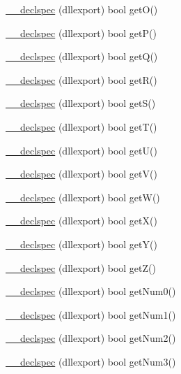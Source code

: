 \begin{DoxyCompactItemize}
\item 
\hyperlink{class_update_data_ac915b9b7ea39948edc30e2be1519f709}{\-\_\-\-\_\-declspec} (dllexport) bool get\-O()
\item 
\hyperlink{class_update_data_af1c7501ba9ff767d1743ab24470b8a7a}{\-\_\-\-\_\-declspec} (dllexport) bool get\-P()
\item 
\hyperlink{class_update_data_aa6581eacfd504ec80c864a4a029d643f}{\-\_\-\-\_\-declspec} (dllexport) bool get\-Q()
\item 
\hyperlink{class_update_data_ace2b66ac3c6fc81d22ea50769842b958}{\-\_\-\-\_\-declspec} (dllexport) bool get\-R()
\item 
\hyperlink{class_update_data_ae9b70a78d59571b58314dd3b4b0be18b}{\-\_\-\-\_\-declspec} (dllexport) bool get\-S()
\item 
\hyperlink{class_update_data_a16254fa55413ea7c37347f54528202c3}{\-\_\-\-\_\-declspec} (dllexport) bool get\-T()
\item 
\hyperlink{class_update_data_ab7969e7d0b5a670bf7a660e07ee3f6d7}{\-\_\-\-\_\-declspec} (dllexport) bool get\-U()
\item 
\hyperlink{class_update_data_a035d09a806173c7166f014ba08baa6a4}{\-\_\-\-\_\-declspec} (dllexport) bool get\-V()
\item 
\hyperlink{class_update_data_a25ced4aeb5fe1bded25ab1556908c5da}{\-\_\-\-\_\-declspec} (dllexport) bool get\-W()
\item 
\hyperlink{class_update_data_adc33999fa417df6ba49edf5067d23fca}{\-\_\-\-\_\-declspec} (dllexport) bool get\-X()
\item 
\hyperlink{class_update_data_a645af2ff970552ad8c1dbb321ff4bda9}{\-\_\-\-\_\-declspec} (dllexport) bool get\-Y()
\item 
\hyperlink{class_update_data_ae426ca7239d958f7ee3ed8761e15de86}{\-\_\-\-\_\-declspec} (dllexport) bool get\-Z()
\item 
\hyperlink{class_update_data_a06bbc26fc1416c4f77051b572badfc5a}{\-\_\-\-\_\-declspec} (dllexport) bool get\-Num0()
\item 
\hyperlink{class_update_data_ac4daf1923558523491759b5cfd201fb1}{\-\_\-\-\_\-declspec} (dllexport) bool get\-Num1()
\item 
\hyperlink{class_update_data_aa350753574338c07f1ed5de6d476d5a3}{\-\_\-\-\_\-declspec} (dllexport) bool get\-Num2()
\item 
\hyperlink{class_update_data_a217fe018b3c4f50f0d08526aeac38202}{\-\_\-\-\_\-declspec} (dllexport) bool get\-Num3()
\item 

\end{DoxyCompactItemize}
